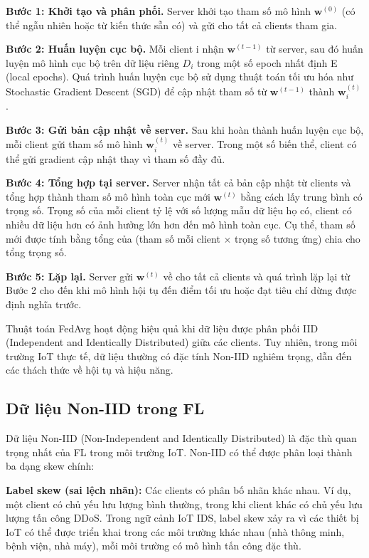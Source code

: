 \textbf{Bước 1: Khởi tạo và phân phối.} Server khởi tạo tham số mô hình $\mathbf{w}^{(0)}$ (có thể ngẫu nhiên hoặc từ kiến thức sẵn có) và gửi cho tất cả clients tham gia.

\textbf{Bước 2: Huấn luyện cục bộ.} Mỗi client i nhận $\mathbf{w}^{(t-1)}$ từ server, sau đó huấn luyện mô hình cục bộ trên dữ liệu riêng $D_{i}$ trong một số epoch nhất định E (local epochs). Quá trình huấn luyện cục bộ sử dụng thuật toán tối ưu hóa như Stochastic Gradient Descent (SGD) để cập nhật tham số từ $\mathbf{w}^{(t-1)}$ thành $\mathbf{w}_{i}^{(t)}$.

\textbf{Bước 3: Gửi bản cập nhật về server.} Sau khi hoàn thành huấn luyện cục bộ, mỗi client gửi tham số mô hình $\mathbf{w}_{i}^{(t)}$ về server. Trong một số biến thể, client có thể gửi gradient cập nhật thay vì tham số đầy đủ.

\textbf{Bước 4: Tổng hợp tại server.} Server nhận tất cả bản cập nhật từ clients và tổng hợp thành tham số mô hình toàn cục mới $\mathbf{w}^{(t)}$ bằng cách lấy trung bình có trọng số. Trọng số của mỗi client tỷ lệ với số lượng mẫu dữ liệu họ có, client có nhiều dữ liệu hơn có ảnh hưởng lớn hơn đến mô hình toàn cục. Cụ thể, tham số mới được tính bằng tổng của (tham số mỗi client $\times$ trọng số tương ứng) chia cho tổng trọng số.

\textbf{Bước 5: Lặp lại.} Server gửi $\mathbf{w}^{(t)}$ về cho tất cả clients và quá trình lặp lại từ Bước 2 cho đến khi mô hình hội tụ đến điểm tối ưu hoặc đạt tiêu chí dừng được định nghĩa trước.

Thuật toán FedAvg hoạt động hiệu quả khi dữ liệu được phân phối IID (Independent and Identically Distributed) giữa các clients. Tuy nhiên, trong môi trường IoT thực tế, dữ liệu thường có đặc tính Non-IID nghiêm trọng, dẫn đến các thách thức về hội tụ và hiệu năng.

\subsection{Dữ liệu Non-IID trong FL}
Dữ liệu Non-IID (Non-Independent and Identically Distributed) là đặc thù quan trọng nhất của FL trong môi trường IoT. Non-IID có thể được phân loại thành ba dạng skew chính:

\textbf{Label skew (sai lệch nhãn):} Các clients có phân bố nhãn khác nhau. Ví dụ, một client có chủ yếu lưu lượng bình thường, trong khi client khác có chủ yếu lưu lượng tấn công DDoS. Trong ngữ cảnh IoT IDS, label skew xảy ra vì các thiết bị IoT có thể được triển khai trong các môi trường khác nhau (nhà thông minh, bệnh viện, nhà máy), mỗi môi trường có mô hình tấn công đặc thù.

